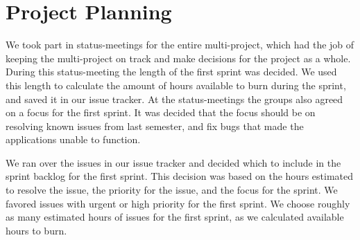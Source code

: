 \section{Project Planning}\label{spr1_projplan}
We took part in status-meetings for the entire multi-project, which had the job of keeping the multi-project on track and make decisions for the project as a whole. During this status-meeting the length of the first sprint was decided. We used this length to calculate the amount of hours available to burn during the sprint, and saved it in our issue tracker. At the status-meetings the groups also agreed on a focus for the first sprint. It was decided that the focus should be on resolving known issues from last semester, and fix bugs that made the applications unable to function.

We ran over the issues in our issue tracker and decided which to include in the sprint backlog for the first sprint. This decision was based on the hours estimated to resolve the issue, the priority for the issue, and the focus for the sprint. We favored issues with urgent or high priority for the first sprint. We choose roughly as many estimated hours of issues for the first sprint, as we calculated available hours to burn. 